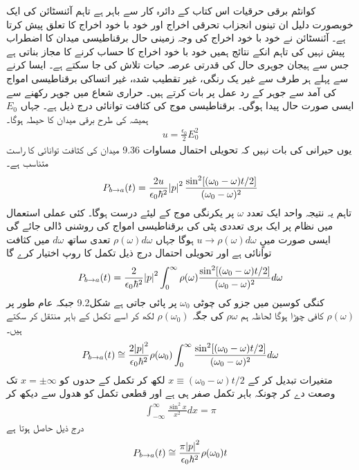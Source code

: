 کوانٹم برقی حرقیات اس کتاب کے دائرہ کار سے باہر ہے تاہم آئنسٹائن کی ایک خوبصورت دلیل ان تینوں انجزاب تحرقی اخراج اور خود با خود اخراج کا تعلق پیش کرتا ہے۔ آئنسٹائن نے خود با خود اخراج کی وجہ زمینی حال برقناطیسی میدان کا اضطراب پیش نہیں کی تاہم انکے نتائج ہمیں خود با خود اخراج کا حساب کرنے کا مجاز بناتی ہے جس سے ہیجان جوہری حال کی قدرتی عرصہ حیات تلاش کی جا سکتے ہے۔ ایسا کرنے سے پہلے ہر طرف سے غیر یک رنگی، غیر تقطیب شدہ، غیر اتساکی برقناطیسی امواج کی آمد سے جوہر کے رد عمل پر بات کرتے ہیں۔ حراری شعاع میں جوہر رکھنے سے ایسی صورت حال پیدا ہوگی۔
برقناطیسی موج کی کثافت توانائی درج ذیل ہے۔ جہاں \(E_0\) ہمیشہ کی طرح برقی میدان کا حیطہ ہوگا۔
\begin{align}
	u = \frac{\epsilon_0}{2}E^2_0
\end{align}
یوں حیرانی کی بات نہیں کہ تحویلی احتمال مساوات \num{9.36} میدان کی کثافت توانائی کا راست متناسب ہے۔
\begin{align}
	P_{b\rightarrow a }(t) = \frac{2u}{\epsilon_0\hbar^2}\abs{p}^2 \frac{\sin^2[(\omega_0-\omega)t/2]}{(\omega_0-\omega)^2}
\end{align}
تاہم یہ نتیجہ واحد ایک تعدد \(\omega\) پر یکرنگی موج کے لیئے درست ہوگا۔ کئی عملی استعمال میں نظام پر ایک بری تعددی پٹی کی برقناطیسی امواج کی روشنی ڈالی جائے گی ایسی صورت میںٍ \(u\rightarrow\rho(\omega)d\omega\) ہوگا جہاں \(\rho(\omega)d\omega\) تعدی ساتھ \(d\omega\) میں کثافت توانائی ہے اور تحویلی احتمال درج ذیل تکمل کا روپ اختیار کرے گا
\begin{align}
	P_{b\rightarrow a}(t) = \frac{2}{\epsilon_0\hbar^2}\abs{p}^2\int_{0}^{\infty}\rho(\omega){\frac{\sin^2[(\omega_0-\omega)t/2]}{(\omega_0-\omega)^2}}d\omega
\end{align}
کنگی کوسین میں جزو کی چوٹی \(\omega_0\) پر پائی جاتی ہے شکل\num{9.2} جبکہ عام طور پر \(\rho(\omega)\) کافی چوڑا ہوگا لحاظہ ہم \(\rho\omega\) کی جگہ \(\rho(\omega_0)\) لکھ کر اسے تکمل کے باہر منتقل کر سکتے ہیں۔
\begin{align}
	P_{b\rightarrow a}(t) \cong \frac{2\abs{p}^2}{\epsilon_0\hbar^2}\rho(\omega_0)\int_{0}^{\infty}\frac{\sin^2[(\omega_0-\omega)t/2]}{(\omega_0-\omega)^2}d\omega
\end{align}
متغیرات تبدیل کر کے \(x\equiv(\omega_0-\omega)t/2\) لکھ کر تکمل کے حدوں کو \(x = \pm\infty\) تک وصعت دے کر چونکہ باہر تکمل صفر ہی ہے اور قطعی تکمل کو ھدول سے دیکھ کر 
\begin{align}
	\int_{-\infty}^{\infty}\frac{\sin^2x}{x^2}dx = \pi
\end{align}
درج ذیل حاصل ہوتا ہے 
\begin{align}
	P_{b\rightarrow a}(t)\cong\frac{\pi\abs{p}^2}{\epsilon_0\hbar^2}\rho(\omega_0)t
\end{align}
